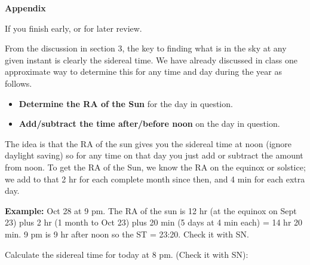 \bigskip
\bigskip
\noindent
{\bf Appendix}

\bigskip 
If you finish early, or for later review.

\medskip
From the discussion in section 3, the key to finding what is in the
sky at any given instant is clearly the sidereal time. We have already
discussed in class one approximate way to determine this for any time
and day during the year as follows.

\begin{itemize} 

\item{\bf Determine the RA of the Sun} for the day in question.

\item {\bf Add/subtract the time after/before noon} on the day in
question.

\end{itemize}
The idea is that the RA of the sun gives you the sidereal time at noon
(ignore daylight saving) so for any time on that day you just add or
subtract the amount from noon. To get the RA of the Sun, we know the
RA on the equinox or solstice; we add to that 2 hr for each complete
month since then, and 4 min for each extra day.

\bigskip
\noindent
{\bf Example:} Oct 28 at 9 pm. The RA of the sun is 12 hr (at the
equinox on Sept 23) plus 2 hr (1 month to Oct 23) plus 20 min (5 days
at 4 min each) = 14 hr 20 min. 9 pm is 9 hr after noon so the ST =
23:20. Check it with SN.

\bigskip
{} Calculate the sidereal time for today at 8
pm. (Check it with SN): \makebox[2cm]{\hrulefill}




